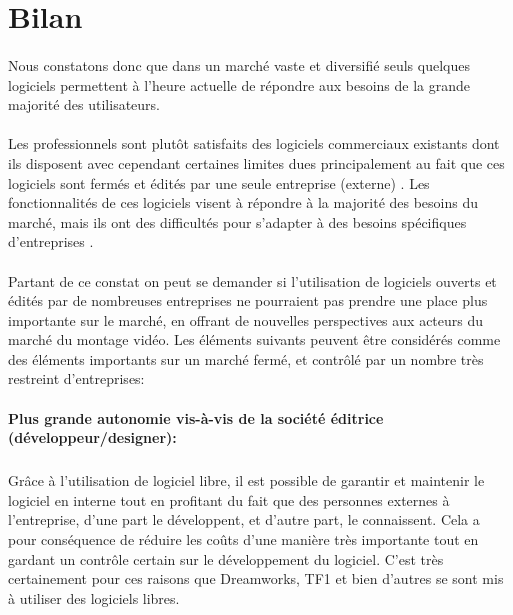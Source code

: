 \newpage

\section {Bilan}

\paragraph { }

Nous constatons donc que dans un marché vaste et diversifié
seuls quelques logiciels permettent à l'heure actuelle de répondre
aux besoins de la grande majorité des utilisateurs.

\paragraph{}

Les professionnels sont plutôt satisfaits des logiciels commerciaux
existants dont ils disposent avec cependant certaines limites dues
principalement au fait que ces logiciels sont fermés et édités par
une seule entreprise (externe) . Les fonctionnalités de ces logiciels visent à
répondre à la majorité des besoins du marché, mais ils ont des
difficultés pour s'adapter à des besoins spécifiques d'entreprises .

\paragraph{}

Partant de ce constat on peut se demander si l'utilisation de logiciels
ouverts et édités par de nombreuses entreprises ne pourraient pas
prendre une place plus importante sur le marché, en offrant de nouvelles
perspectives aux acteurs du marché du montage vidéo. Les éléments
suivants peuvent être considérés comme des éléments importants sur un
marché fermé, et contrôlé par un nombre très restreint d'entreprises:

\paragraph{Plus grande autonomie vis-à-vis de la société éditrice
(développeur/designer):}

  \subparagraph{ }

    Grâce à l'utilisation de logiciel libre, il est possible de garantir
    et maintenir le logiciel en interne tout en profitant du fait que
    des personnes externes à l'entreprise, d'une part le développent,
    et d'autre part, le connaissent. Cela a pour conséquence de réduire les coûts
    d'une manière très importante tout en gardant un contrôle
    certain sur le développement du logiciel. C'est très certainement pour
    ces raisons que Dreamworks, TF1 et bien d'autres se sont mis à utiliser
    des logiciels libres.

